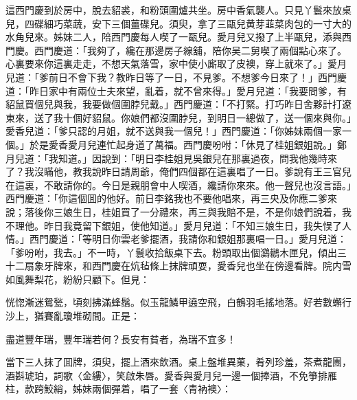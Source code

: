 這西門慶到於房中，脫去貂裘，和粉頭圍爐共坐。房中香氣襲人。只見丫鬟來放桌兒，四碟細巧菜蔬，安下三個薑碟兒。須臾，拿了三甌兒黄芽韮菜肉包的一寸大的水角兒來。姊妹二人，陪西門慶每人喫了一甌兒。愛月兒又撥了上半甌兒，添與西門慶。西門慶道：「我夠了，纔在那邊房子線舖，陪你吴二舅喫了兩個點心來了。心裏要來你這裏走走，不想天氣落雪，家中使小廝取了皮襖，穿上就來了。」愛月兒道：「爹前日不會下我？教昨日等了一日，不見爹。不想爹今日來了！」西門慶道：「昨日家中有兩位士夫來望，亂着，就不曾來得。」愛月兒道：「我要問爹，有貂鼠買個兒與我，我要做個圍脖兒戴。」西門慶道：「不打緊。打巧昨日舍夥計打遼東來，送了我十個好貂鼠。你娘們都沒圍脖兒，到明日一總做了，送一個來與你。」愛香兒道：「爹只認的月姐，就不送與我一個兒！」西門慶道：「你姊妹兩個一家一個。」於是愛香愛月兒連忙起身道了萬福。西門慶吩咐：「休見了桂姐銀姐說。」鄭月兒道：「我知道。」因說到：「明日李桂姐見吳銀兒在那裏過夜，問我他幾時來了？我沒瞞他，教我說昨日請周爺，俺們四個都在這裏唱了一日。爹說有王三官兒在這裏，不敢請你的。今日是親朋會中人喫酒，纔請你來來。他一聲兒也沒言語。」西門慶道：「你這個囬的他好。前日李銘我也不要他唱來，再三央及你應二爹來說；落後你三娘生日，桂姐買了一分禮來，再三與我賠不是，不是你娘們說着，我不理他。昨日我竟留下銀姐，使他知道。」愛月兒道：「不知三娘生日，我失悮了人情。」西門慶道：「等明日你雲老爹擺酒，我請你和銀姐那裏唱一日。」愛月兒道：「爹吩咐，我去。」不一時，丫鬟收拾飯桌下去。粉頭取出個鸂鶒木匣兒，傾出三十二扇象牙牌來，和西門慶在炕毡條上抹牌頑耍，愛香兒也坐在傍邊看牌。院内雪如風舞梨花，紛紛只顧下。但見：

\begin{myquote}
恍惚漸迷鴛甃，頃刻拂滿蜂鬚。似玉龍鱗甲遶空飛，白鶴羽毛搖地落。好若數蠏行沙上，猶賽亂瓊堆砌間。正是：

盡道豐年瑞，豐年瑞若何？長安有貧者，為瑞不宜多！
\end{myquote}

當下三人抹了囬牌，須臾，擺上酒來飲酒。桌上盤堆異菓，肴列珍羞，茶煮龍團，酒斟琥珀，詞歌〈金縷〉，笑啟朱唇。愛香與愛月兒一邊一個捧酒，不免箏排雁柱，款跨鮫綃，姊妹兩個彈着，唱了一套〈青衲襖〉：

